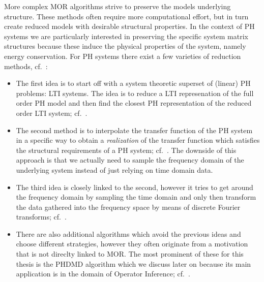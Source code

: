 More complex MOR algorithms strive to preserve the models underlying structure.
These methods often require more computational effort, but in turn create reduced models with desirable structural properties.
In the context of \ac{PH} systems we are particularly interested in preserving the specific system matrix structures because these induce the physical properties of the system, namely energy conservation.
For \ac{PH} systems there exist a few varieties of reduction methods, cf.~\cite{Polyuga2010}:
\begin{itemize}
    \item The first idea is to start off with a system theoretic superset of (linear) \ac{PH} problems: \ac{LTI} systems.
        The idea is to reduce a \ac{LTI} represenation of the full order \ac{PH} model and then find the closest \ac{PH} representation of the reduced order \ac{LTI} system; cf.~\cite{Gillis2018, Cherifi2019}.
    \item The second method is to interpolate the transfer function of the \ac{PH} system in a specific way to obtain a \emph{realization} of the transfer function which satisfies the structural requirements of a \ac{PH} system; cf.~\cite{BGD2020, Schwerdtner2021, Poussot2022}.
        The downside of this approach is that we actually need to sample the frequency domain of the underlying system instead of just relying on time domain data.
    \item The third idea is closely linked to the second, however it tries to get around the frequency domain by sampling the time domain and only then transform the data gathered into the frequency space by means of discrete Fourier transforms; cf.~\cite{Najnudel2021, Cherifi2022, Günther2023}.
    \item There are also additional algorithms which avoid the previous ideas and choose different strategies, however they often originate from a motivation that is not direclty linked to \ac{MOR}.
        The most prominent of these for this thesis is the \ac{PHDMD} algorithm which we discuss later on because its main application is in the domain of Operator Inference; cf.~\cite{Morandin2022}.
\end{itemize}

